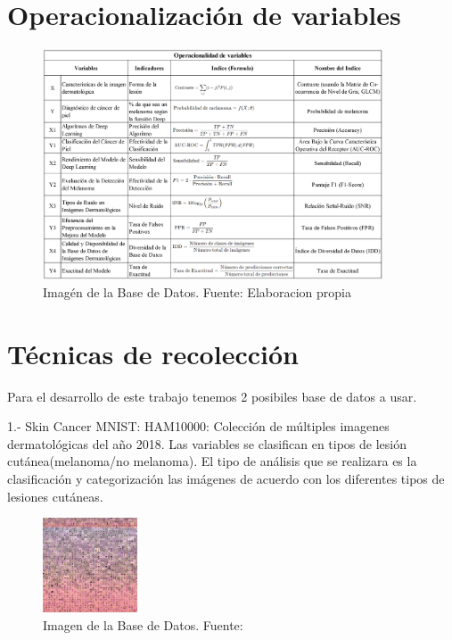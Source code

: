 \section{Operacionalización de variables}




\begin{figure}[h]
	\begin{center}
		\includegraphics[width=0.9\textwidth]{3/figures/Operaciones de variables.png}
		\caption{Imagén de la Base de Datos. Fuente: Elaboracion propia}
		\label{1:fig 20}
	\end{center}
\end{figure}








\section{Técnicas de recolección}

Para el desarrollo de este trabajo tenemos 2 posibiles base de datos a usar.


1.-  Skin Cancer MNIST: HAM10000: Colección de múltiples imagenes dermatológicas del año 2018. Las variables se clasifican en tipos de lesión cutánea(melanoma/no melanoma). El tipo de análisis que se realizara es la clasificación y categorización las imágenes de acuerdo con los diferentes tipos de lesiones cutáneas.

\begin{figure}[h]
	\begin{center}
		\includegraphics[width=0.25\textwidth]{3/figures/dataset-card.png}
		\caption{Imagen de la Base de Datos. Fuente: \cite{kaggleSkinCancer}}
		\label{1:fig 17}
	\end{center}
\end{figure}




